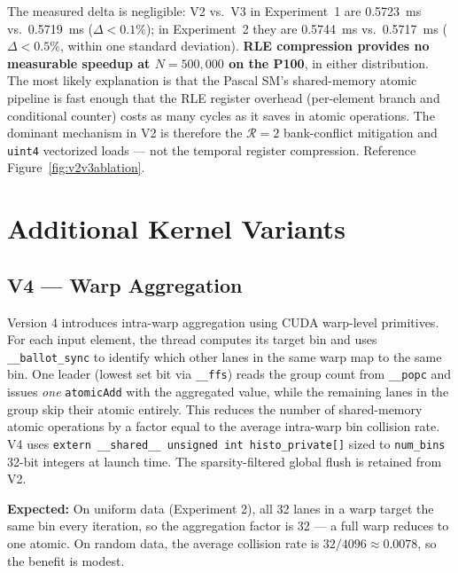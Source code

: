 \documentclass[11pt, letterpaper]{article}
\newcommand{\EOneVTwoAvg}{0.5723}
\newcommand{\EOneVThreeAvg}{0.5719}
\newcommand{\ETwoVTwoAvg}{0.5744}
\newcommand{\ETwoVThreeAvg}{0.5717}
\begin{document}
The measured delta is negligible: V2 vs.\ V3 in Experiment~1 are
\EOneVTwoAvg~ms vs.\ \EOneVThreeAvg~ms ($\Delta < 0.1\%$); in
Experiment~2 they are \ETwoVTwoAvg~ms vs.\ \ETwoVThreeAvg~ms
($\Delta < 0.5\%$, within one standard deviation).
\textbf{RLE compression provides no measurable speedup at $N=500{,}000$ on
the P100}, in either distribution.
The most likely explanation is that the Pascal SM's shared-memory atomic
pipeline is fast enough that the RLE register overhead (per-element branch
and conditional counter) costs as many cycles as it saves in atomic
operations.
The dominant mechanism in V2 is therefore the $\mathcal{R}{=}2$
bank-conflict mitigation and \texttt{uint4} vectorized loads --- not the
temporal register compression.
Reference Figure~\ref{fig:v2v3ablation}.

\section{Additional Kernel Variants}

\subsection*{V4 — Warp Aggregation}

Version 4 introduces intra-warp aggregation using CUDA warp-level
primitives.  For each input element, the thread computes its target bin and
uses \texttt{\_\_ballot\_sync} to identify which other lanes in the same warp
map to the same bin.  One leader (lowest set bit via \texttt{\_\_ffs}) reads
the group count from \texttt{\_\_popc} and issues \emph{one}
\texttt{atomicAdd} with the aggregated value, while the remaining lanes in
the group skip their atomic entirely.
This reduces the number of shared-memory atomic operations by a factor equal
to the average intra-warp bin collision rate.
V4 uses \texttt{extern \_\_shared\_\_ unsigned int histo\_private[]} sized to
\texttt{num\_bins} 32-bit integers at launch time.
The sparsity-filtered global flush is retained from V2.

\textbf{Expected:} On uniform data (Experiment 2), all 32 lanes in a warp
target the same bin every iteration, so the aggregation factor is 32 ---
a full warp reduces to one atomic.  On random data, the average collision
rate is $32/4096 \approx 0.0078$, so the benefit is modest.
\end{document}
